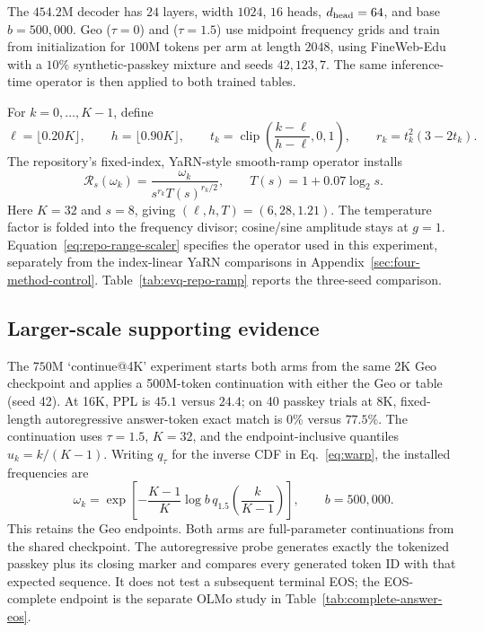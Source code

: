 The $454.2$M decoder has $24$ layers, width $1024$, $16$ heads,
$d_{\rm head}=64$, and base $b=500{,}000$. Geo ($\tau=0$) and \evq{}
($\tau=1.5$) use midpoint frequency grids and train from initialization
for $100$M tokens per arm at length $2048$, using FineWeb-Edu with a
$10\%$ synthetic-passkey mixture and seeds $42,123,7$.
The same inference-time operator is then applied to both trained tables.

For $k=0,\ldots,K-1$, define
\[
\ell=\lfloor0.20K\rfloor,\qquad h=\lfloor0.90K\rfloor,\qquad
t_k=\operatorname{clip}\!\left(\frac{k-\ell}{h-\ell},0,1\right),\qquad
r_k=t_k^2(3-2t_k).
\]
The repository's fixed-index, YaRN-style smooth-ramp operator installs
\begin{equation}
\mathcal R_s(\omega_k)=
\frac{\omega_k}{s^{r_k}T(s)^{r_k/2}},
\qquad T(s)=1+0.07\log_2s.
\label{eq:repo-range-scaler}
\end{equation}
Here $K=32$ and $s=8$, giving $(\ell,h,T)=(6,28,1.21)$.
The temperature factor is folded into the frequency divisor; cosine/sine
amplitude stays at $g=1$. Equation~\eqref{eq:repo-range-scaler} specifies
the operator used in this experiment, separately from the index-linear YaRN
comparisons in Appendix~\ref{sec:four-method-control}.
Table~\ref{tab:evq-repo-ramp} reports the three-seed comparison.



\FloatBarrier
\subsection{Larger-scale supporting evidence}
\label{sec:larger-scale-supporting}

The \(750\mathrm{M}\) `continue@4K' experiment starts both arms from the same
2K Geo checkpoint and applies a 500M-token continuation with either the Geo or
\evq{} table (seed 42). At 16K, PPL is \(45.1\) versus \(24.4\); on
40 passkey trials at 8K, fixed-length autoregressive answer-token exact match is \(0\%\) versus
\(77.5\%\). The \evq{} continuation uses $\tau=1.5$, $K=32$, and the
endpoint-inclusive quantiles $u_k=k/(K-1)$. Writing $q_\tau$ for the
inverse CDF in Eq.~\eqref{eq:warp}, the installed frequencies are
\[
\omega_k=\exp\!\left[-\frac{K-1}{K}\log b\,
q_{1.5}\!\left(\frac{k}{K-1}\right)\right],\qquad b=500{,}000.
\]
This retains the Geo endpoints. Both arms are full-parameter continuations
from the shared checkpoint. The autoregressive probe generates exactly the tokenized passkey plus its closing marker and compares every generated token ID with that expected sequence. It does not test a subsequent terminal EOS; the EOS-complete endpoint is the separate OLMo study in Table~\ref{tab:complete-answer-eos}.

